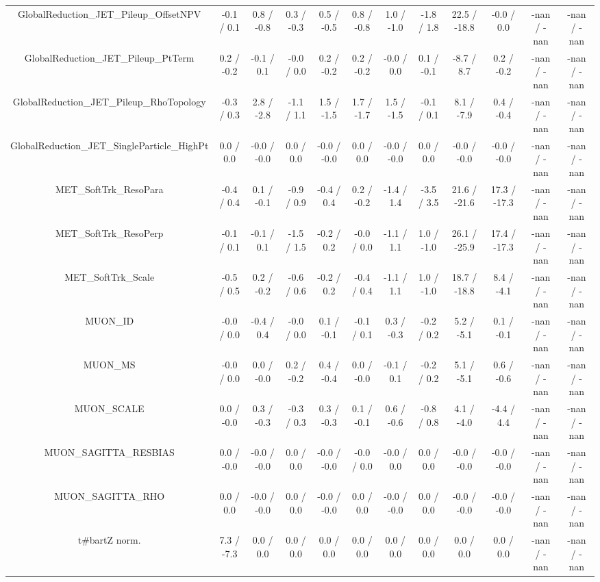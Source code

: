 \begin{table}[htbp]
\begin{center}
\begin{tabular}{|c|c|c|c|c|c|c|c|c|c|c|c|}
  GlobalReduction_JET_Pileup_OffsetNPV & -0.1 / 0.1 & 0.8 / -0.8 & 0.3 / -0.3 & 0.5 / -0.5 & 0.8 / -0.8 & 1.0 / -1.0 & -1.8 / 1.8 & 22.5 / -18.8 & -0.0 / 0.0 & -nan / -nan & -nan / -nan \\ 
  GlobalReduction_JET_Pileup_PtTerm & 0.2 / -0.2 & -0.1 / 0.1 & -0.0 / 0.0 & 0.2 / -0.2 & 0.2 / -0.2 & -0.0 / 0.0 & 0.1 / -0.1 & -8.7 / 8.7 & 0.2 / -0.2 & -nan / -nan & -nan / -nan \\ 
  GlobalReduction_JET_Pileup_RhoTopology & -0.3 / 0.3 & 2.8 / -2.8 & -1.1 / 1.1 & 1.5 / -1.5 & 1.7 / -1.7 & 1.5 / -1.5 & -0.1 / 0.1 & 8.1 / -7.9 & 0.4 / -0.4 & -nan / -nan & -nan / -nan \\ 
  GlobalReduction_JET_SingleParticle_HighPt & 0.0 / 0.0 & -0.0 / -0.0 & 0.0 / 0.0 & -0.0 / -0.0 & 0.0 / 0.0 & -0.0 / -0.0 & 0.0 / 0.0 & -0.0 / -0.0 & -0.0 / -0.0 & -nan / -nan & -nan / -nan \\ 
  MET_SoftTrk_ResoPara & -0.4 / 0.4 & 0.1 / -0.1 & -0.9 / 0.9 & -0.4 / 0.4 & 0.2 / -0.2 & -1.4 / 1.4 & -3.5 / 3.5 & 21.6 / -21.6 & 17.3 / -17.3 & -nan / -nan & -nan / -nan \\ 
  MET_SoftTrk_ResoPerp & -0.1 / 0.1 & -0.1 / 0.1 & -1.5 / 1.5 & -0.2 / 0.2 & -0.0 / 0.0 & -1.1 / 1.1 & 1.0 / -1.0 & 26.1 / -25.9 & 17.4 / -17.3 & -nan / -nan & -nan / -nan \\ 
  MET_SoftTrk_Scale & -0.5 / 0.5 & 0.2 / -0.2 & -0.6 / 0.6 & -0.2 / 0.2 & -0.4 / 0.4 & -1.1 / 1.1 & 1.0 / -1.0 & 18.7 / -18.8 & 8.4 / -4.1 & -nan / -nan & -nan / -nan \\ 
  MUON_ID & -0.0 / 0.0 & -0.4 / 0.4 & -0.0 / 0.0 & 0.1 / -0.1 & -0.1 / 0.1 & 0.3 / -0.3 & -0.2 / 0.2 & 5.2 / -5.1 & 0.1 / -0.1 & -nan / -nan & -nan / -nan \\ 
  MUON_MS & -0.0 / 0.0 & 0.0 / -0.0 & 0.2 / -0.2 & 0.4 / -0.4 & 0.0 / -0.0 & -0.1 / 0.1 & -0.2 / 0.2 & 5.1 / -5.1 & 0.6 / -0.6 & -nan / -nan & -nan / -nan \\ 
  MUON_SCALE & 0.0 / -0.0 & 0.3 / -0.3 & -0.3 / 0.3 & 0.3 / -0.3 & 0.1 / -0.1 & 0.6 / -0.6 & -0.8 / 0.8 & 4.1 / -4.0 & -4.4 / 4.4 & -nan / -nan & -nan / -nan \\ 
  MUON_SAGITTA_RESBIAS & 0.0 / -0.0 & -0.0 / -0.0 & 0.0 / 0.0 & -0.0 / -0.0 & -0.0 / 0.0 & -0.0 / 0.0 & 0.0 / 0.0 & -0.0 / -0.0 & -0.0 / -0.0 & -nan / -nan & -nan / -nan \\ 
  MUON_SAGITTA_RHO & 0.0 / 0.0 & -0.0 / -0.0 & 0.0 / 0.0 & -0.0 / -0.0 & 0.0 / 0.0 & -0.0 / -0.0 & 0.0 / 0.0 & -0.0 / -0.0 & -0.0 / -0.0 & -nan / -nan & -nan / -nan \\ 
  t#bar{t}Z norm. & 7.3 / -7.3 & 0.0 / 0.0 & 0.0 / 0.0 & 0.0 / 0.0 & 0.0 / 0.0 & 0.0 / 0.0 & 0.0 / 0.0 & 0.0 / 0.0 & 0.0 / 0.0 & -nan / -nan & -nan / -nan \\ 

\end{tabular}
\end{center}
\end{table}
